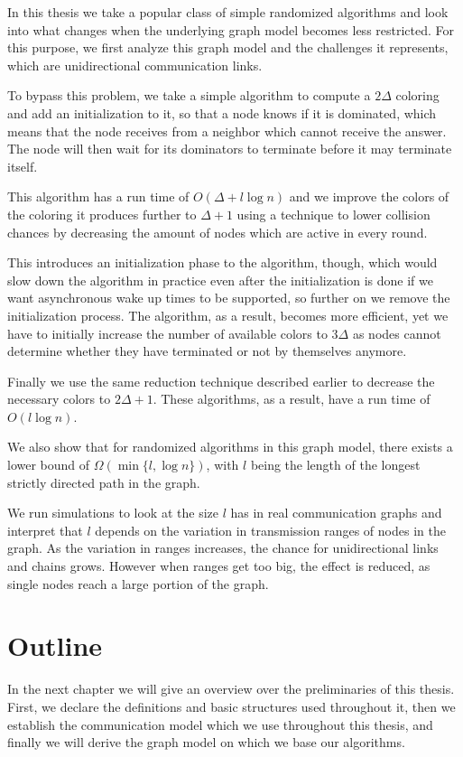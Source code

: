 In this thesis we take a popular class of simple randomized algorithms and look into what changes when the underlying graph model becomes less restricted. For this purpose, we first analyze this graph model and the challenges it represents, which are unidirectional communication links.

To bypass this problem, we take a simple algorithm to compute a $2\Delta$ coloring and add an initialization to it, so that a node knows if it is dominated, which means that the node receives from a neighbor which cannot receive the answer. The node will then wait for its dominators to terminate before it may terminate itself.

This algorithm has a run time of $O(\Delta + l \log n)$ and we improve the colors of the coloring it produces further to $\Delta+1$ using a technique to lower collision chances by decreasing the amount of nodes which are active in every round.

This introduces an initialization phase to the algorithm, though, which would slow down the algorithm in practice even after the initialization is done if we want asynchronous wake up times to be supported, so further on we remove the initialization process. The algorithm, as a result, becomes more efficient, yet we have to initially increase the number of available colors to $3\Delta$ as nodes cannot determine whether they have terminated or not by themselves anymore.

Finally we use the same reduction technique described earlier to decrease the necessary colors to $2\Delta +1$. These algorithms, as a result, have a run time of $O(l \log n)$.

We also show that for randomized algorithms in this graph model, there exists a lower bound of $\Omega(\min\{l, \log n\})$, with $l$ being the length of the longest strictly directed path in the graph.

We run simulations to look at the size $l$ has in real communication graphs and interpret that $l$ depends on the variation in transmission ranges of nodes in the graph. As the variation in ranges increases, the chance for unidirectional links and chains grows. However when ranges get too big, the effect is reduced, as single nodes reach a large portion of the graph.

\section{Outline}

In the next chapter we will give an overview over the preliminaries of this thesis. First, we declare the definitions and basic structures used throughout it, then we establish the communication model which we use throughout this thesis, and finally we will derive the graph model on which we base our algorithms.

